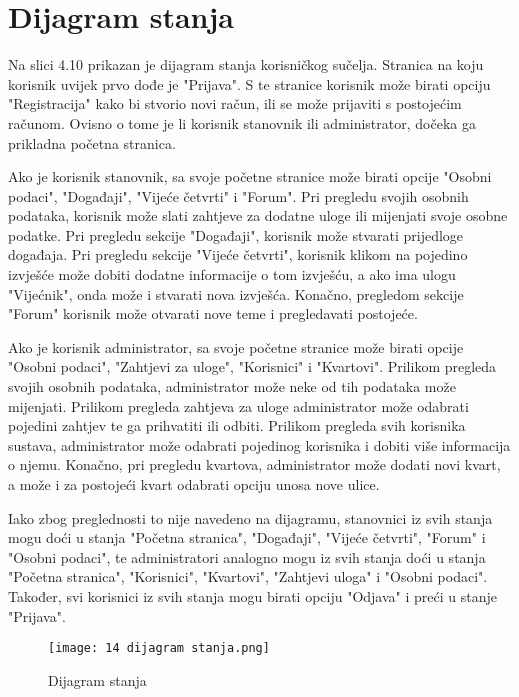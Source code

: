 			
			\eject
			
		
		\section{Dijagram stanja}
		
		Na slici 4.10 prikazan je dijagram stanja korisničkog sučelja. Stranica na koju korisnik uvijek prvo dođe je "Prijava". S te stranice korisnik može birati opciju "Registracija" kako bi stvorio novi račun, ili se može prijaviti s postojećim računom. Ovisno o tome je li korisnik stanovnik ili administrator, dočeka ga prikladna početna stranica. 
		
		Ako je korisnik stanovnik, sa svoje početne stranice može birati opcije "Osobni podaci", "Događaji", "Vijeće četvrti" i "Forum". Pri pregledu svojih osobnih podataka, korisnik može slati zahtjeve za dodatne uloge ili mijenjati svoje osobne podatke. Pri pregledu sekcije "Događaji", korisnik može stvarati prijedloge događaja. Pri pregledu sekcije "Vijeće četvrti", korisnik klikom na pojedino izvješće može dobiti dodatne informacije o tom izvješću, a ako ima ulogu "Vijećnik", onda može i stvarati nova izvješća. Konačno, pregledom sekcije "Forum" korisnik može otvarati nove teme i pregledavati postojeće.
		
		Ako je korisnik administrator, sa svoje početne stranice može birati opcije "Osobni podaci", "Zahtjevi za uloge", "Korisnici" i "Kvartovi". Prilikom pregleda svojih osobnih podataka, administrator može neke od tih podataka može mijenjati. Prilikom pregleda zahtjeva za uloge administrator može odabrati pojedini zahtjev te ga prihvatiti ili odbiti. Prilikom pregleda svih korisnika sustava, administrator može odabrati pojedinog korisnika i dobiti više informacija o njemu. Konačno, pri pregledu kvartova, administrator može dodati novi kvart, a može i za postojeći kvart odabrati opciju unosa nove ulice.
		
		Iako zbog preglednosti to nije navedeno na dijagramu, stanovnici iz svih stanja mogu doći u stanja "Početna stranica", "Događaji", "Vijeće četvrti", "Forum" i "Osobni podaci", te administratori analogno mogu iz svih stanja doći u stanja "Početna stranica", "Korisnici", "Kvartovi", "Zahtjevi uloga" i "Osobni podaci". Također, svi korisnici iz svih stanja mogu birati opciju "Odjava" i preći u stanje "Prijava".
			
			
						\begin{figure}[H]
					\centering
					\texttt{[image: 14 dijagram stanja.png]}
					\caption{Dijagram stanja}
				\end{figure}	
			
